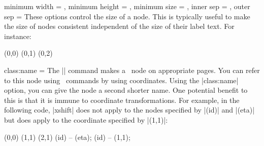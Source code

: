 \begin{sseqdata}[|| name = ex1, cohomological Serre grading]
\begin{keylist}{minimum width = , minimum height = , minimum size = , inner sep = , outer sep = }
These options control the size of a node. This is typically useful to make the size of nodes consistent independent of the size of their label text.  For instance:
\begin{codeexample}[width = 5cm]
\begin{sseqdata}[ name = minimum width example, no axes, yscale = 0.8 ]
\class["ab"](0,0)
\class["a"](0,1)
\class(0,2)
\end{sseqdata}
\printpage[ name = minimum width example ]
\printpage[ name = minimum width example,
  change classes = { blue, minimum width = width("ab") + 0.5em } ]
\end{codeexample}
\end{keylist}

\begin{key}{class:name = }
The |\class| command makes a \tikzpkg\ node on appropriate pages. You can refer to this node using \tikzpkg\ commands by using coordinates. Using the |class:name| option, you can give the node a second shorter name. One potential benefit to this is that it is immune to coordinate transformations. For example, in the following code, |xshift| does not apply to the nodes specified by |(id)| and |(eta)| but does apply to the coordinate specified by |(1,1)|:

\begin{codeexample}[width = 6cm]
\begin{sseqpage}
\class[class:name = id](0,0)
\class[class:name = eta](1,1)
\class(2,1)
\draw[xshift = 1] (id) -- (eta);
\draw[xshift = 1,blue] (id) -- (1,1);
\end{sseqpage}
\end{codeexample}
\end{key}


\end{sseqdata}

